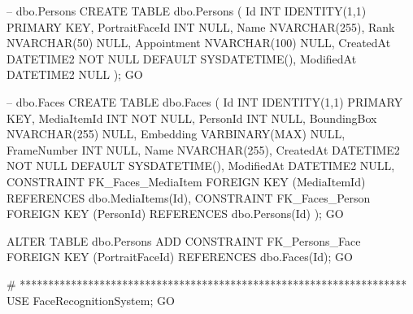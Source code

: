 -- dbo.Persons
CREATE TABLE dbo.Persons (
    Id INT IDENTITY(1,1) PRIMARY KEY,
    PortraitFaceId INT NULL,
    Name NVARCHAR(255),
    Rank NVARCHAR(50) NULL,
    Appointment NVARCHAR(100) NULL,
    CreatedAt DATETIME2 NOT NULL DEFAULT SYSDATETIME(),
    ModifiedAt DATETIME2 NULL
);
GO

-- dbo.Faces
CREATE TABLE dbo.Faces (
    Id INT IDENTITY(1,1) PRIMARY KEY, 
    MediaItemId INT NOT NULL,
    PersonId INT NULL,
    BoundingBox NVARCHAR(255) NULL,
    Embedding VARBINARY(MAX) NULL, 
    FrameNumber INT NULL,
    Name NVARCHAR(255),
    CreatedAt DATETIME2 NOT NULL DEFAULT SYSDATETIME(),
    ModifiedAt DATETIME2 NULL,
    CONSTRAINT FK_Faces_MediaItem FOREIGN KEY (MediaItemId) REFERENCES dbo.MediaItems(Id),
    CONSTRAINT FK_Faces_Person FOREIGN KEY (PersonId) REFERENCES dbo.Persons(Id)
);
GO

ALTER TABLE dbo.Persons
ADD CONSTRAINT FK_Persons_Face FOREIGN KEY (PortraitFaceId) REFERENCES dbo.Faces(Id);
GO

# ********************************************************************
USE FaceRecognitionSystem;
GO

